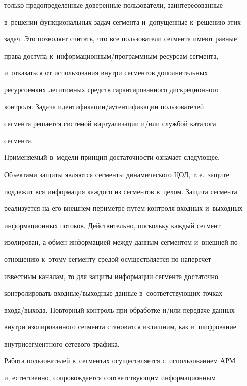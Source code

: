 только предопределенные доверенные пользователи, заинтересованные 


в~решении функциональных задач сегмента и~допущенные к~решению этих 


задач. Это позволяет считать, что все пользователи сегмента имеют равные 


права доступа к~информационным/программным ресурсам сегмента, 


и~отказаться от использования внутри сегментов дополнительных 


ресурсоемких легитимных средств гарантированного дискреционного 


контроля. Задача иден\-ти\-фи\-ка\-ции/аутен\-ти\-фи\-ка\-ции пользователей 


сегмента решается системой виртуализации и/или службой каталога 


сегмента.





Применяемый в~модели принцип достаточности означает следующее. 


Объектами защиты являются сегменты динамического ЦОД, т.\,е.\ защите 


подлежит вся информация каждого из сегментов в~целом. Защита сегмента 


реализуется на его внешнем периметре путем контроля входных и~выходных 


информационных потоков. Действительно, поскольку каждый сегмент 


изолирован, а обмен информацией между данным сегментом и~внешней по 


отношению к~этому сегменту средой осуществляется по наперечет 


известным каналам, то для защиты информации сегмента достаточно 


контролировать входные\!/\!выходные данные в~соответствующих точках 


входа/выхода. Повторный контроль при обработке и\!/\!или передаче данных 


внутри изолированного сегмента становится излишним, как и~шифрование 


внутрисегментного сетевого трафика.





Работа пользователей в~сегментах осуществляется с~использованием АРМ 


и, естественно, сопровождается соответствующим информационным 


